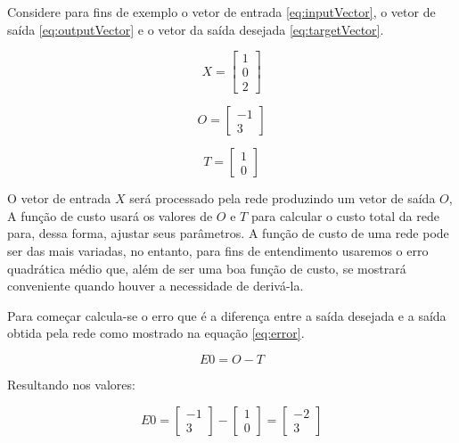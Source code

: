 \begin{apendicesenv}
		\par Considere  para fins de exemplo o vetor de entrada \ref{eq:inputVector}, o vetor de saída \ref{eq:outputVector} e o vetor da saída desejada \ref{eq:targetVector}.
		
		\begin{equation}\label{eq:inputVector}
 		 X = \begin{bmatrix}
			 	1 \\
			 	0 \\
			 	2  
			 \end{bmatrix}
		\end{equation}
	
		\begin{equation}\label{eq:outputVector}
			O = \begin{bmatrix}
				-1 \\
				3 
			\end{bmatrix}
		\end{equation}
	
		\begin{equation}\label{eq:targetVector}
		T = \begin{bmatrix}
			1 \\
			0 
		\end{bmatrix}
		\end{equation}
		
		\par O vetor de entrada $X$ será processado pela rede produzindo um vetor de saída $O$, A função de custo usará os valores de $O$ e $T$ para calcular o custo total da rede para, dessa forma, ajustar seus parâmetros. A função de custo de uma rede pode ser das mais variadas, no entanto, para fins de entendimento usaremos o erro quadrática médio que, além de ser uma boa função de custo, se mostrará conveniente quando houver a necessidade de derivá-la.
		
		\par Para começar calcula-se o erro que é a diferença entre a saída desejada e a saída obtida pela rede como mostrado na equação \ref{eq:error}.
		
		\begin{equation}\label{eq:error}
			E0 = O - T
		\end{equation}
	
		\par Resultando nos valores:
		
		\begin{equation}\label{eq:outputVector}
			E0 = \begin{bmatrix}
					-1 \\
					3 
			\end{bmatrix}-\begin{bmatrix}
				1 \\
				0 
			\end{bmatrix} =\begin{bmatrix}
				-2 \\
				3 
			\end{bmatrix}
		\end{equation}
	

\end{apendicesenv}
